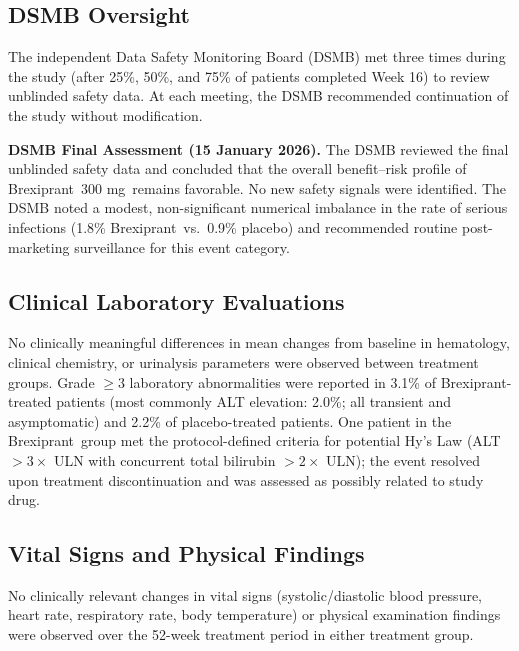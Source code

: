 \documentclass[11pt, a4paper]{article}
\newcommand{\studydrug}{Brexiprant}
\newcommand{\studydose}{300 mg}
\begin{document}
\subsection{DSMB Oversight}

The independent Data Safety Monitoring Board (DSMB) met three times during the study (after 25\%, 50\%, and 75\% of patients completed Week 16) to review unblinded safety data. At each meeting, the DSMB recommended continuation of the study without modification.

\begin{dsmbbox}
\textbf{DSMB Final Assessment (15 January 2026).} The DSMB reviewed the final unblinded safety data and concluded that the overall benefit--risk profile of \studydrug\ \studydose\ remains favorable. No new safety signals were identified. The DSMB noted a modest, non-significant numerical imbalance in the rate of serious infections (1.8\% \studydrug\ vs.\ 0.9\% placebo) and recommended routine post-marketing surveillance for this event category.
\end{dsmbbox}

\subsection{Clinical Laboratory Evaluations}

No clinically meaningful differences in mean changes from baseline in hematology, clinical chemistry, or urinalysis parameters were observed between treatment groups. Grade $\ge 3$ laboratory abnormalities were reported in 3.1\% of \studydrug-treated patients (most commonly ALT elevation: 2.0\%; all transient and asymptomatic) and 2.2\% of placebo-treated patients. One patient in the \studydrug\ group met the protocol-defined criteria for potential Hy's Law (ALT $> 3\times$ ULN with concurrent total bilirubin $> 2\times$ ULN); the event resolved upon treatment discontinuation and was assessed as possibly related to study drug.

\subsection{Vital Signs and Physical Findings}

No clinically relevant changes in vital signs (systolic/diastolic blood pressure, heart rate, respiratory rate, body temperature) or physical examination findings were observed over the 52-week treatment period in either treatment group.

\newpage
\end{document}
